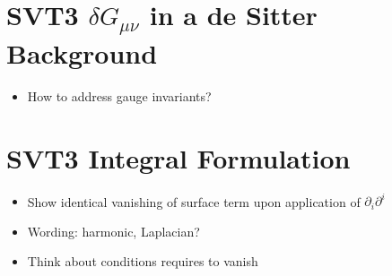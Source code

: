 \documentclass[10pt,letterpaper]{article}
\numberwithin{equation}{section}
\begin{document}
\section*{SVT3 $\delta G_{\mu\nu}$ in a de Sitter Background}
\begin{itemize}
	\item How to address gauge invariants?
\end{itemize}

\section*{SVT3 Integral Formulation}
\begin{itemize}
	\item Show identical vanishing of surface term upon application of $\partial_i \partial^i$
	\item Wording: harmonic, Laplacian?
	\item Think about conditions requires to vanish
\end{itemize}
\end{document}

